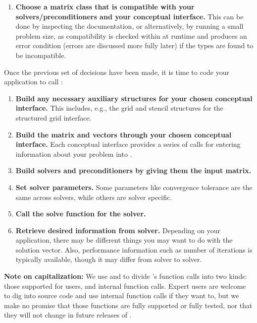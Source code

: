 \begin{itemize}
\begin{enumerate}
\item 
{\bf Choose a matrix class that is compatible with your solvers/preconditioners and your
conceptual 
interface.} This can be done by inspecting the documentation, or alternatively,
by running a small 
problem size, as compatibility is checked within \hypre{} at runtime and produces
an error condition 
(errors are discussed more fully later) if the types are found to be
incompatible.

\end{enumerate}

Once the previous set of decisions have been made, it is time to code your application 
to call \hypre{}:

\begin{enumerate}

\item
{\bf Build any necessary auxiliary structures for your chosen conceptual
interface.} This includes, e.g., 
the grid and stencil structures for the structured grid interface.

\item
{\bf Build the matrix and vectors through your chosen conceptual interface.} Each
conceptual interface 
provides a series of calls for entering information about your problem into
\hypre{}.

\item
{\bf Build solvers and preconditioners by giving them the input matrix.}

\item
{\bf Set solver parameters.} Some parameters like convergence tolerance are the
same across solvers, 
while others are solver specific.

\item
{\bf Call the solve function for the solver.}

\item
{\bf Retrieve desired information from solver.} Depending on your application,
there may be different 
things you may want to do with the solution vector. Also, performance
information such as number of 
iterations is typically available, though it may differ from solver to solver.

\end{enumerate}


{\bf Note on capitalization:} We use  and 
to divide \hypre{}'s function
calls into two kinds: 
those supported for users, and internal function calls. Expert users are
welcome to dig into \hypre{} source 
code and use internal function calls if they want to, but we make no promise
that those functions are fully 
supported or fully tested, nor that they will not change in future releases of
\hypre{}. 


\end{itemize}
